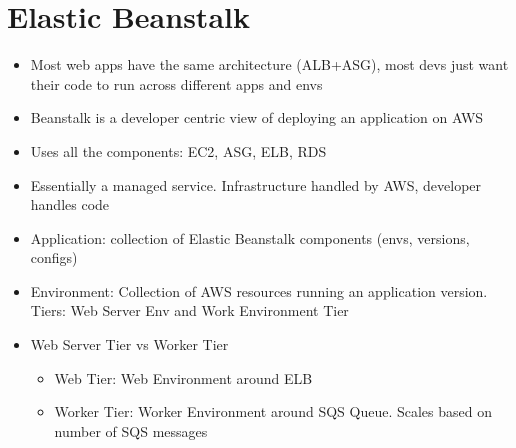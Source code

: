 \documentclass[]{scrartcl}
\begin{document}
\section{Elastic Beanstalk}
\begin{itemize}
	\item Most web apps have the same architecture (ALB+ASG), most devs just want their code to run across different apps and envs
	\item Beanstalk is a developer centric view of deploying an application on AWS
	\item Uses all the components: EC2, ASG, ELB, RDS
	\item Essentially a managed service. Infrastructure handled by AWS, developer handles code
	\item Application: collection of Elastic Beanstalk components (envs, versions, configs)
	\item Environment: Collection of AWS resources running an application version. Tiers: Web Server Env and Work Environment Tier
	\item Web Server Tier vs Worker Tier
	\begin{itemize}
		\item Web Tier: Web Environment around ELB
		\item Worker Tier: Worker Environment around SQS Queue. Scales based on number of SQS messages
	\end{itemize}
\end{itemize}
\end{document}
